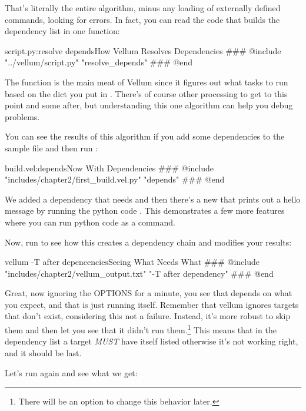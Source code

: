 That's literally the entire algorithm, minus any loading of externally defined
commands, looking for errors.  In fact, you can read the code that builds the
dependency list in one function:

\begin{code}{script.py:resolve depends}{How Vellum Resolves Dependencies}
### @include "../vellum/script.py" "resolve_depends"
### @end
\end{code}

The  function is the main meat of Vellum since
it figures out what tasks to run based on the dict you put in .
There's of course other processing to get to this point and some after, but
understanding this one algorithm can help you debug problems.

You can see the results of this algorithm if you add some dependencies to the
sample file and then run :

\begin{code}{build.vel:depends}{Now With Dependencies}
### @include "includes/chapter2/first_build.vel.py" "depends"
### @end
\end{code}

We added a dependency that  needs  and then
there's a new  that prints out a hello message by running 
the python code .  This demonstrates a few
more features where you can run python code as a command.

Now, run  to see how this creates a dependency chain and
modifies your results:

\begin{code}{vellum -T after depencencies}{Seeing What Needs What}
### @include "includes/chapter2/vellum_output.txt" "-T after dependency"
### @end
\end{code}

Great, now ignoring the OPTIONS for a minute, you see that  depends
on what you expect, and that  is just running itself.  Remember
that vellum ignores targets that don't exist, considering this not a failure.
Instead, it's more robust to skip them and then let you see that it didn't run
them.\footnote{There will be an option to change this behavior later.}  This
means that in the dependency list a target \emph{MUST} have itself listed
otherwise it's not working right, and it should be last.

Let's run  again and see what we get:

